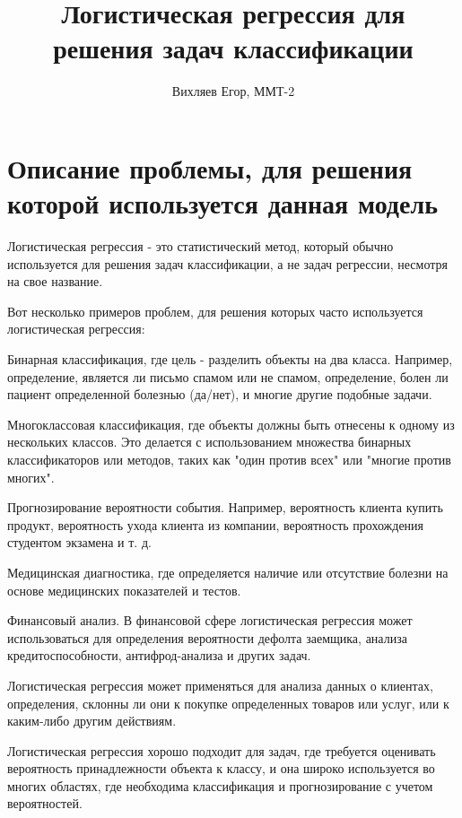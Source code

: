 \documentclass[12pt, letterpaper, twoside]{article}
\title{Логистическая регрессия для решения задач классификации}
\author{Вихляев Егор, ММТ-2}
\begin{document}
\maketitle

\begin{abstract}

\end{abstract}

\section{Описание проблемы, для решения которой используется данная модель}

Логистическая регрессия - это статистический метод, который обычно используется для решения задач классификации, а не задач регрессии, несмотря на свое название.

Вот несколько примеров проблем, для решения которых часто используется логистическая регрессия:

Бинарная классификация, где цель - разделить объекты на два класса. Например, определение, является ли письмо спамом или не спамом, определение, болен ли пациент определенной болезнью (да/нет), и многие другие подобные задачи.

Многоклассовая классификация, где объекты должны быть отнесены к одному из нескольких классов. Это делается с использованием множества бинарных классификаторов или методов, таких как "один против всех" или "многие против многих".

Прогнозирование вероятности события. Например, вероятность клиента купить продукт, вероятность ухода клиента из компании, вероятность прохождения студентом экзамена и т. д.

Медицинская диагностика, где определяется наличие или отсутствие болезни на основе медицинских показателей и тестов.

Финансовый анализ. В финансовой сфере логистическая регрессия может использоваться для определения вероятности дефолта заемщика, анализа кредитоспособности, антифрод-анализа и других задач.

Логистическая регрессия может применяться для анализа данных о клиентах, определения, склонны ли они к покупке определенных товаров или услуг, или к каким-либо другим действиям.

Логистическая регрессия хорошо подходит для задач, где требуется оценивать вероятность принадлежности объекта к классу, и она широко используется во многих областях, где необходима классификация и прогнозирование с учетом вероятностей.
\end{document}
